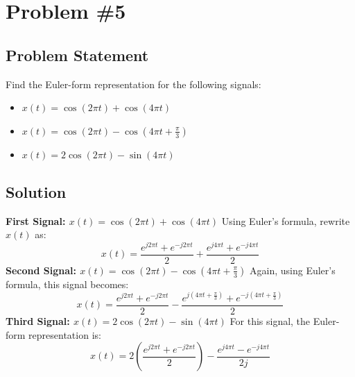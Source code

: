 \documentclass{article}
\begin{document}
\newpage
\section*{Problem \#5}
\subsection*{Problem Statement}
Find the Euler-form representation for the following signals:

\begin{itemize}
    \item \( x(t) = \cos(2\pi t) + \cos(4\pi t) \)
    \item \( x(t) = \cos(2\pi t) - \cos(4\pi t + \frac{\pi}{3}) \)
    \item \( x(t) = 2\cos(2\pi t) - \sin(4\pi t) \)
\end{itemize}

\subsection*{Solution}
\textbf{First Signal: \( x(t) = \cos(2\pi t) + \cos(4\pi t) \)}
\newline
Using Euler's formula, rewrite \( x(t) \) as:
\newline
\[
x(t) = \frac{e^{j 2\pi t} + e^{-j 2\pi t}}{2} + \frac{e^{j 4\pi t} + e^{-j 4\pi t}}{2}
\]
\newline \newline
\textbf{Second Signal: \( x(t) = \cos(2\pi t) - \cos(4\pi t + \frac{\pi}{3}) \)}
\newline
Again, using Euler's formula, this signal becomes:
\newline
\[
x(t) = \frac{e^{j 2\pi t} + e^{-j 2\pi t}}{2} - \frac{e^{j (4\pi t + \frac{\pi}{3})} + e^{-j (4\pi t + \frac{\pi}{3})}}{2}
\]
\newline \newline
\textbf{Third Signal: \( x(t) = 2\cos(2\pi t) - \sin(4\pi t) \)}
\newline
For this signal, the Euler-form representation is:
\newline
\[
x(t) = 2 \left( \frac{e^{j 2\pi t} + e^{-j 2\pi t}}{2} \right) - \frac{e^{j 4\pi t} - e^{-j 4\pi t}}{2j}
\]
\end{document}
